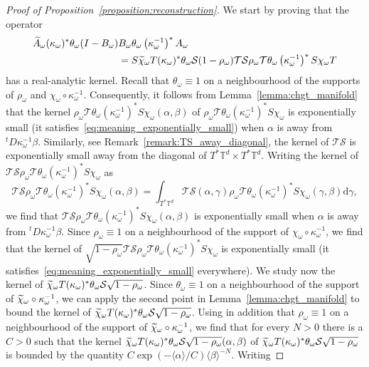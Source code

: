 \documentclass[AHL,Unicode,longabstracts,published]{cedram}
\newcommand{\brac}[1]{\langle #1 \rangle}
\newcommand{\clT}{\mathcal{T}}
\newcommand{\clS}{\mathcal{S}}
\newcommand{\bbT}{\mathbb{T}}
\newcommand{\rmd}{\mathrm{d}}
\let\oldtilde\tilde
\renewcommand*{\tilde}[1]{\mathchoice{\widetilde{#1}}{\widetilde{#1}}{\oldtilde{#1}}{\oldtilde{#1}}}
\begin{document}
\begin{proof}[Proof of Proposition~\ref{proposition:reconstruction}]
We start by proving that the operator
\begin{equation}\label{eq:analytic_1}
\begin{split}
\widetilde{A}_\omega (\kappa_\omega)^* \theta_\omega (I - B_\omega) & B_\omega \theta_\omega \left(\kappa_\omega^{-1}\right)^* A_\omega \\
& = S \tilde{\chi}_\omega T (\kappa_\omega)^*\theta_\omega \clS (1 - \rho_\omega) \clT \clS \rho_\omega \clT \theta_\omega \left(\kappa_\omega^{-1}\right)^* S \chi_\omega T
\end{split}
\end{equation}
has a real-analytic kernel. Recall that $\theta_\omega \equiv 1$ on a neighbourhood of the supports of $\rho_\omega$ and $\chi_\omega \circ \kappa_\omega^{-1}$. Consequently, it follows from Lemma~\ref{lemma:chgt_manifold} that the kernel $\rho_\omega \clT \theta_\omega (\kappa_\omega^{-1})^* S \chi_\omega(\alpha,\beta)$ of $\rho_\omega \clT \theta_\omega (\kappa_\omega^{-1})^* S \chi_\omega$ is exponentially small (it satisfies~\eqref{eq:meaning_exponentially_small}) when $\alpha$ is away from ${}^t D \kappa_\omega^{-1} \beta$. Similarly, see Remark~\ref{remark:TS_away_diagonal}, the kernel of $\clT\clS$ is exponentially small away from the diagonal of $T^* \bbT^d \times T^* \bbT^d$. Writing the kernel of $\clT \clS \rho_\omega \clT \theta_\omega (\kappa_\omega^{-1})^* S \chi_\omega$ as
\begin{equation*}
\clT \clS \rho_\omega \clT \theta_\omega \left(\kappa_\omega^{-1}\right)^* S \chi_\omega(\alpha,\beta) = \int_{T^* \bbT^d} \clT\clS(\alpha,\gamma) \rho_\omega \clT \theta_\omega \left(\kappa_\omega^{-1}\right)^* S \chi_\omega(\gamma,\beta) \rmd \gamma,
\end{equation*}
we find that $\clT \clS \rho_\omega \clT \theta_\omega (\kappa_\omega^{-1})^* S \chi_\omega(\alpha,\beta)$ is exponentially small when $\alpha$ is away from ${}^t D \kappa_\omega^{-1} \beta$. Since $\rho_\omega \equiv 1$ on a neighbourhood of the support of $\chi_\omega \circ \kappa_\omega^{-1}$, we find that the kernel of $\sqrt{1 - \rho_\omega}\clT \clS \rho_\omega \clT \theta_\omega (\kappa_\omega^{-1})^* S \chi_\omega$ is exponentially small (it satisfies~\eqref{eq:meaning_exponentially_small} everywhere). We study now the kernel of $\tilde{\chi}_\omega T (\kappa_\omega)^*\theta_\omega \clS \sqrt{1 - \rho_\omega}$. Since $\theta_\omega \equiv 1$ on a neighbourhood of the support of $\tilde{\chi}_\omega \circ \kappa_\omega^{-1}$, we can apply the second point in Lemma~\ref{lemma:chgt_manifold} to bound the kernel of $\tilde{\chi}_\omega T (\kappa_\omega)^*\theta_\omega \clS \sqrt{1 - \rho_\omega}$. Using in addition that $\rho_\omega \equiv 1$ on a neighbourhood of the support of $\tilde{\chi}_\omega \circ \kappa_\omega^{-1}$, we find that for every $N > 0$ there is a $C > 0 $ such that the kernel $\tilde{\chi}_\omega T (\kappa_\omega)^*\theta_\omega \clS \sqrt{1 - \rho_\omega}(\alpha,\beta)$ of $\tilde{\chi}_\omega T (\kappa_\omega)^*\theta_\omega \clS \sqrt{1 - \rho_\omega}$ is bounded by the quantity $C\exp(- \brac{\alpha}/C) \brac{\beta}^{-N}$. Writing

\end{proof}
\end{document}
